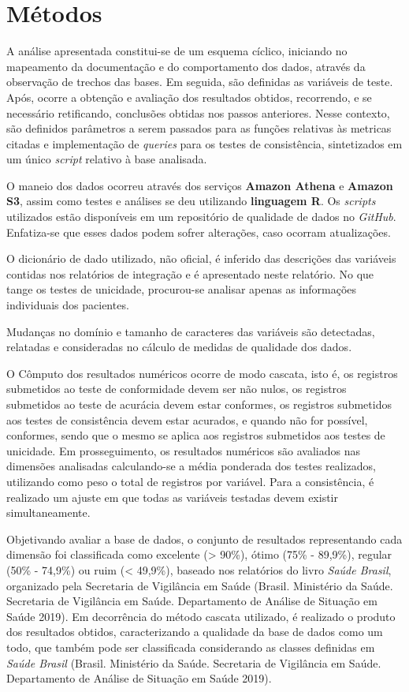 \documentclass[
  12,
]{proadi}
\begin{document}
\hypertarget{muxe9todos}{%
\section{Métodos}\label{muxe9todos}}

A análise apresentada constitui-se de um esquema cíclico, iniciando no
mapeamento da documentação e do comportamento dos dados, através da
observação de trechos das bases. Em seguida, são definidas as variáveis
de teste. Após, ocorre a obtenção e avaliação dos resultados obtidos,
recorrendo, e se necessário retificando, conclusões obtidas nos passos
anteriores. Nesse contexto, são definidos parâmetros a serem passados
para as funções relativas às metricas citadas e implementação de
\emph{queries} para os testes de consistência, sintetizados em um único
\emph{script} relativo à base analisada.

O maneio dos dados ocorreu através dos serviços \textbf{Amazon Athena} e
\textbf{Amazon S3}, assim como testes e análises se deu utilizando
\textbf{linguagem R}. Os \emph{scripts} utilizados estão disponíveis em
um repositório de qualidade de dados no \emph{GitHub}. Enfatiza-se que
esses dados podem sofrer alterações, caso ocorram atualizações.

O dicionário de dado utilizado, não oficial, é inferido das descrições
das variáveis contidas nos relatórios de integração e é apresentado
neste relatório. No que tange os testes de unicidade, procurou-se
analisar apenas as informações individuais dos pacientes.

Mudanças no domínio e tamanho de caracteres das variáveis são
detectadas, relatadas e consideradas no cálculo de medidas de qualidade
dos dados.

O Cômputo dos resultados numéricos ocorre de modo cascata, isto é, os
registros submetidos ao teste de conformidade devem ser não nulos, os
registros submetidos ao teste de acurácia devem estar conformes, os
registros submetidos aos testes de consistência devem estar acurados, e
quando não for possível, conformes, sendo que o mesmo se aplica aos
registros submetidos aos testes de unicidade. Em prosseguimento, os
resultados numéricos são avaliados nas dimensões analisadas
calculando-se a média ponderada dos testes realizados, utilizando como
peso o total de registros por variável. Para a consistência, é realizado
um ajuste em que todas as variáveis testadas devem existir
simultaneamente.

Objetivando avaliar a base de dados, o conjunto de resultados
representando cada dimensão foi classificada como excelente
(\textgreater{} 90\%), ótimo (75\% - 89,9\%), regular (50\% - 74,9\%) ou
ruim (\textless{} 49,9\%), baseado nos relatórios do livro \emph{Saúde
Brasil}, organizado pela Secretaria de Vigilância em Saúde (Brasil.
Ministério da Saúde. Secretaria de Vigilância em Saúde. Departamento de
Análise de Situação em Saúde 2019). Em decorrência do método cascata
utilizado, é realizado o produto dos resultados obtidos, caracterizando
a qualidade da base de dados como um todo, que também pode ser
classificada considerando as classes definidas em \emph{Saúde Brasil}
(Brasil. Ministério da Saúde. Secretaria de Vigilância em Saúde.
Departamento de Análise de Situação em Saúde 2019).
\end{document}
